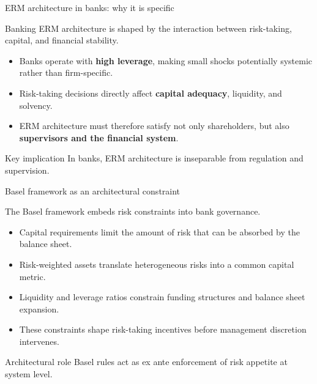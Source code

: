 \documentclass[aspectratio=169, 10pt]{beamer} %
\begin{document}
\begin{frame}{ERM architecture in banks: why it is specific}

Banking ERM architecture is shaped by the interaction between
risk-taking, capital, and financial stability.

\medskip

\begin{itemize}
  \item[$\bullet$] Banks operate with \textbf{high leverage}, making small
  shocks potentially systemic rather than firm-specific.

  \item[$\bullet$] Risk-taking decisions directly affect \textbf{capital adequacy},
  liquidity, and solvency.

  \item[$\bullet$] ERM architecture must therefore satisfy not only shareholders,
  but also \textbf{supervisors and the financial system}.
\end{itemize}

\begin{block}{Key implication}
In banks, ERM architecture is inseparable from regulation and supervision.
\end{block}

\end{frame}

\begin{frame}{Basel framework as an architectural constraint}

The Basel framework embeds risk constraints into bank governance.

\medskip

\begin{itemize}
  \item[$\bullet$] Capital requirements limit the amount of risk that can be
  absorbed by the balance sheet.

  \item[$\bullet$] Risk-weighted assets translate heterogeneous risks into
  a common capital metric.

  \item[$\bullet$] Liquidity and leverage ratios constrain funding structures
  and balance sheet expansion.

  \item[$\bullet$] These constraints shape risk-taking incentives before
  management discretion intervenes.
\end{itemize}

\begin{block}{Architectural role}
Basel rules act as ex ante enforcement of risk appetite at system level.
\end{block}

\end{frame}
\end{document}
